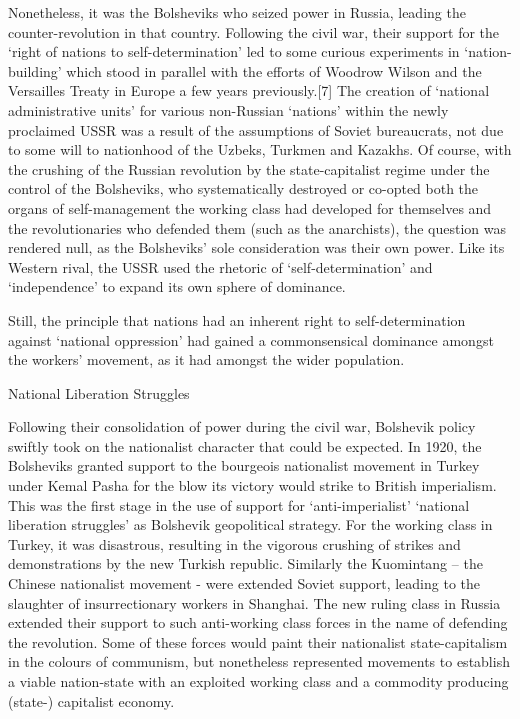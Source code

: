 Nonetheless, it was the Bolsheviks who seized power in Russia, leading the counter-revolution in that country. Following the civil war, their support for the ‘right of nations to self-determination’ led to some curious experiments in ‘nation-building’ which stood in parallel with the efforts of Woodrow Wilson and the Versailles Treaty in Europe a few years previously.[7] The creation of ‘national administrative units’ for various non-Russian ‘nations’ within the newly proclaimed USSR was a result of the assumptions of Soviet bureaucrats, not due to some will to nationhood of the Uzbeks, Turkmen and Kazakhs. Of course, with the crushing of the Russian revolution by the state-capitalist regime under the control of the Bolsheviks, who systematically destroyed or co-opted both the organs of self-management the working class had developed for themselves and the revolutionaries who defended them (such as the anarchists), the question was rendered null, as the Bolsheviks’ sole consideration was their own power. Like its Western rival, the USSR used the rhetoric of ‘self-determination’ and ‘independence’ to expand its own sphere of dominance.

Still, the principle that nations had an inherent right to self-determination against ‘national oppression’ had gained a commonsensical dominance amongst the workers’ movement, as it had amongst the wider population.

National Liberation Struggles

Following their consolidation of power during the civil war, Bolshevik policy swiftly took on the nationalist character that could be expected. In 1920, the Bolsheviks granted support to the bourgeois nationalist movement in Turkey under Kemal Pasha for the blow its victory would strike to British imperialism. This was the first stage in the use of support for ‘anti-imperialist’ ‘national liberation struggles’ as Bolshevik geopolitical strategy. For the working class in Turkey, it was disastrous, resulting in the vigorous crushing of strikes and demonstrations by the new Turkish republic. Similarly the Kuomintang – the Chinese nationalist movement - were extended Soviet support, leading to the slaughter of insurrectionary workers in Shanghai. The new ruling class in Russia extended their support to such anti-working class forces in the name of defending the revolution. Some of these forces would paint their nationalist state-capitalism in the colours of communism, but nonetheless represented movements to establish a viable nation-state with an exploited working class and a commodity producing (state-) capitalist economy.

